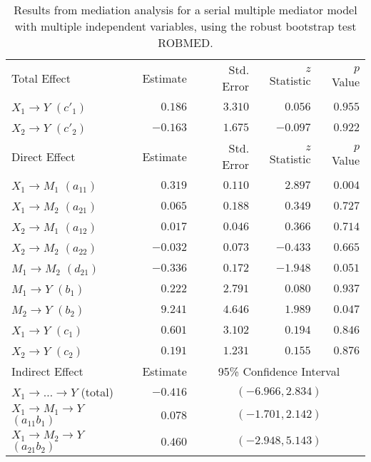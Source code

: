 \documentclass{article}\usepackage[]{graphicx}\usepackage[]{xcolor}
\begin{document}
\begin{table}[h!]
\caption{Results from mediation analysis for a serial multiple mediator model with multiple independent variables, using the robust bootstrap test ROBMED.}
\begin{center}
\begin{tabular}{lrrrr}
\hline\noalign{\smallskip}
Total Effect & Estimate & Std. Error & $z$ Statistic & $p$ Value \\ 
\noalign{\smallskip}\hline\noalign{\smallskip}
$X_{1} \rightarrow Y$ $(c'_{1})$ & $0.186$ & $3.310$ & $0.056$ & $0.955$ \\ 
$X_{2} \rightarrow Y$ $(c'_{2})$ & $-0.163$ & $1.675$ & $-0.097$ & $0.922$ \\ 
\noalign{\smallskip}\hline\noalign{\smallskip}
Direct Effect & Estimate & Std. Error & $z$ Statistic & $p$ Value \\ 
\noalign{\smallskip}\hline\noalign{\smallskip}
$X_{1} \rightarrow M_{1}$ $(a_{11})$ & $0.319$ & $0.110$ & $2.897$ & $0.004$ \\ 
$X_{1} \rightarrow M_{2}$ $(a_{21})$ & $0.065$ & $0.188$ & $0.349$ & $0.727$ \\ 
$X_{2} \rightarrow M_{1}$ $(a_{12})$ & $0.017$ & $0.046$ & $0.366$ & $0.714$ \\ 
$X_{2} \rightarrow M_{2}$ $(a_{22})$ & $-0.032$ & $0.073$ & $-0.433$ & $0.665$ \\ 
$M_{1} \rightarrow M_{2}$ $(d_{21})$ & $-0.336$ & $0.172$ & $-1.948$ & $0.051$ \\ 
$M_{1} \rightarrow Y$ $(b_{1})$ & $0.222$ & $2.791$ & $0.080$ & $0.937$ \\ 
$M_{2} \rightarrow Y$ $(b_{2})$ & $9.241$ & $4.646$ & $1.989$ & $0.047$ \\ 
$X_{1} \rightarrow Y$ $(c_{1})$ & $0.601$ & $3.102$ & $0.194$ & $0.846$ \\ 
$X_{2} \rightarrow Y$ $(c_{2})$ & $0.191$ & $1.231$ & $0.155$ & $0.876$ \\ 
\noalign{\smallskip}\hline\noalign{\smallskip}
Indirect Effect & Estimate & \multicolumn{3}{c}{95\% Confidence Interval} \\ 
\noalign{\smallskip}\hline\noalign{\smallskip}
$X_{1} \rightarrow  \ldots  \rightarrow Y$ (total) & $-0.416$ & \multicolumn{3}{c}{$(-6.966, 2.834)$} \\ 
$X_{1} \rightarrow M_{1} \rightarrow Y$ $(a_{11}b_{1})$ & $0.078$ & \multicolumn{3}{c}{$(-1.701, 2.142)$} \\ 
$X_{1} \rightarrow M_{2} \rightarrow Y$ $(a_{21}b_{2})$ & $0.460$ & \multicolumn{3}{c}{$(-2.948, 5.143)$} \\ 

\end{tabular}
\end{center}
\end{table}
\end{document}
